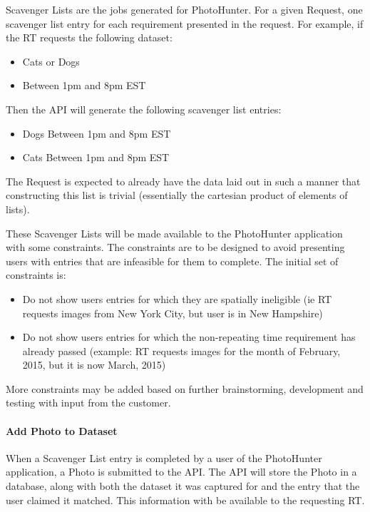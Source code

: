 \documentclass{article}
\begin{document}
Scavenger Lists are the jobs generated for PhotoHunter.  For a given
Request, one scavenger list entry for each requirement presented in
the request. For example, if the RT requests the following dataset:

\begin{itemize}
  \item Cats or Dogs
  \item Between 1pm and 8pm EST
\end{itemize}

Then the API will generate the following scavenger list entries:

\begin{itemize}
  \item Dogs Between 1pm and 8pm EST
  \item Cats Between 1pm and 8pm EST
\end{itemize}

The Request is expected to already have the data laid out in such a manner that
constructing this list is trivial (essentially the cartesian product of
elements of lists).

These Scavenger Lists will be made available to the PhotoHunter application
with some constraints.  The constraints are to be designed to avoid presenting
users with entries that are infeasible for them to complete.  The initial set
of constraints is:

\begin{itemize}
  \item Do not show users entries for which they are spatially ineligible (ie RT
    requests images from New York City, but user is in New Hampshire)
  \item Do not show users entries for which the non-repeating time requirement
    has already passed (example: RT requests images for the month of February,
    2015, but it is now March, 2015)
\end{itemize}

More constraints may be added based on further brainstorming, development and
testing with input from the customer.

\paragraph{Add Photo to Dataset}

When a Scavenger List entry is completed by a user of the PhotoHunter
application, a Photo is submitted to the API.  The API will store the Photo in
a database, along with both the dataset it was captured for and the entry that
the user claimed it matched.  This information with be available to the
requesting RT.
\end{document}
